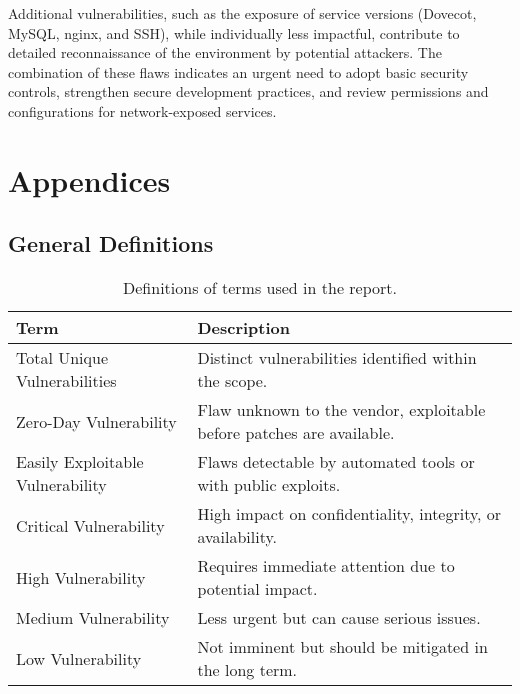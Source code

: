\documentclass[a4paper,12pt]{article}
\begin{document}
Additional vulnerabilities, such as the exposure of service versions (Dovecot, MySQL, nginx, and SSH), while individually less impactful, contribute to detailed reconnaissance of the environment by potential attackers. The combination of these flaws indicates an urgent need to adopt basic security controls, strengthen secure development practices, and review permissions and configurations for network-exposed services.

\section{Appendices}

\subsection{General Definitions}
\begin{table}[ht]
    \centering
    \begin{tabular}{lp{8cm}}
        \toprule
        \rowcolor{gray!20} \textbf{Term} & \textbf{Description} \\
        \midrule
        Total Unique Vulnerabilities & Distinct vulnerabilities identified within the scope. \\ \hline
        Zero-Day Vulnerability & Flaw unknown to the vendor, exploitable before patches are available. \\ \hline
        Easily Exploitable Vulnerability & Flaws detectable by automated tools or with public exploits. \\ \hline
        Critical Vulnerability & High impact on confidentiality, integrity, or availability. \\ \hline
        High Vulnerability & Requires immediate attention due to potential impact. \\ \hline
        Medium Vulnerability & Less urgent but can cause serious issues. \\ \hline
        Low Vulnerability & Not imminent but should be mitigated in the long term. \\
        \bottomrule
    \end{tabular}
    \caption{Definitions of terms used in the report.}
\end{table}

\clearpage
\end{document}
